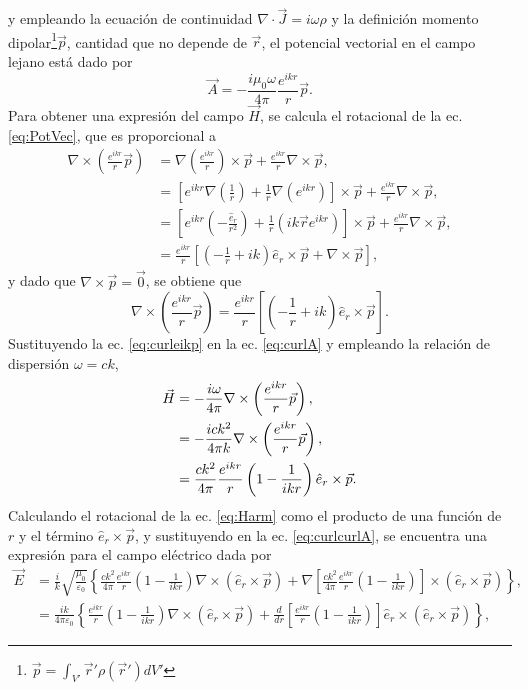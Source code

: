 \documentclass[letterpaper, 12pt] {article}
\newcommand{\er}{\ensuremath{\hat{e}_r}}
\begin{document}
y empleando la ecuación de continuidad $\nabla \cdot \vec{J} = i\omega\rho$ y la definición momento dipolar\footnote{$\vec{p} = \int_{V'} \vec{r}'\rho(\vec{r}')dV'$}$\vec{p}$, cantidad que no depende de $\vec{r}$, el potencial vectorial en el campo lejano está dado por
\begin{equation}
\vec{A} = - \frac{i \mu_0 \omega}{4\pi} \frac{e^{i k r}}{r}  \vec{p}. \label{eq:PotVecArm}
\end{equation}
Para obtener una expresión del campo $\vec{H}$, se calcula el rotacional de la ec. \eqref{eq:PotVec}, que es proporcional a
\begin{align*}
\nabla\times\left(\frac{e^{ikr}}{r}\vec{p}\right) &= \nabla\left(\frac{e^{ikr}}{r}  \right)\times \vec{p} + \frac{e^{ikr}}{r} \nabla\times\vec{p},\\
			&=\left[ e^{ikr} \nabla\left(\frac{1}{r}\right) + \frac{1}{r}\nabla\left(e^{ikr}\right)\right]\times \vec{p} + \frac{e^{ikr}}{r} \nabla\times\vec{p},\\
			&= \left[e^{ikr} \left(- \frac{\er}{r^2}\right) + \frac{1}{r}\left(i k \vec{r} e^{ikr}\right) \right]\times \vec{p}      + \frac{e^{ikr}}{r} \nabla\times\vec{p},\\
			&= \frac{e^{ikr}}{r} \left[\left(-\frac{1}{r} + ik \right)\er\times\vec{p} +\nabla\times\vec{p} \right],
 \end{align*}
y dado que $\nabla\times\vec{p} = \vec{0}$, se obtiene que 
\begin{equation}
\nabla\times\left(\frac{e^{ikr}}{r}\vec{p}\right)  = \frac{e^{ikr}}{r} \left[\left(-\frac{1}{r} + ik \right)\er\times\vec{p} \right].
\label{eq:curleikp}
\end{equation}
Sustituyendo la ec. \eqref{eq:curleikp} en la ec. \eqref{eq:curlA} y empleando la relación de dispersión $\omega = c k$,
\begin{align}
\vec{H} &= -\frac{i\omega}{4\pi}\nabla\times\left(\frac{e^{ikr}}{r}\vec{p}\right), \notag\\
		&= -\frac{ick^2}{4\pi k}\nabla\times\left(\frac{e^{ikr}}{r}\vec{p}\right),\notag\\
		&= \frac{ck^2}{4\pi}\frac{e^{ikr}}{r} \left(1 -\frac{1}{ikr} \right)\er\times\vec{p}.	\label{eq:Harm}
\end{align}
Calculando el rotacional de la ec. \eqref{eq:Harm} como el producto de una función de $r$ y el término $\er\times\vec{p}$, y sustituyendo en la ec. \eqref{eq:curlcurlA}, se encuentra una expresión para el campo eléctrico dada por
\begin{align*}
\vec{E} &=\frac{i}{k}\sqrt{\frac{\mu_0}{\varepsilon_0}}    \left\{   \frac{ck^2}{4\pi}\frac{e^{ikr}}{r} \left(1 -\frac{1}{ikr} \right) \nabla\times\left( \er\times\vec{p} 
			\right) + \nabla \left[   \frac{ck^2}{4\pi}\frac{e^{ikr}}{r} \left(1 -\frac{1}{ikr} \right)  \right]\times  \left( \er\times\vec{p}  \right)   \right\},\\
		&=\frac{ik}{4\pi\varepsilon_0}    \left\{  \frac{e^{ikr}}{r} \left(1 -\frac{1}{ikr} \right) \nabla\times\left( \er\times\vec{p} 
			\right) + \frac{d}{dr} \left[   \frac{e^{ikr}}{r} \left(1 -\frac{1}{ikr} \right)  \right] \er\times \left( \er\times\vec{p}  \right)   \right\},
\end{align*}
\end{document}
